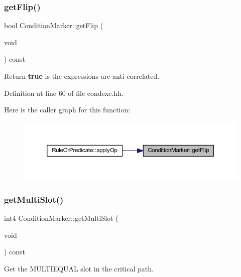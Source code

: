 \subsubsection{\texorpdfstring{getFlip()}{getFlip()}}
{\footnotesize\ttfamily bool Condition\+Marker\+::get\+Flip (\begin{DoxyParamCaption}\item[{void}]{ }\end{DoxyParamCaption}) const\hspace{0.3cm}{\ttfamily [inline]}}



Return {\bfseries{true}} is the expressions are anti-\/correlated. 



Definition at line 60 of file condexe.\+hh.

Here is the caller graph for this function\+:
\nopagebreak
\begin{figure}[H]
\begin{center}
\leavevmode
\includegraphics[width=350pt]{class_condition_marker_ac1a25557679f0be858c5bee6bd691b23_icgraph}
\end{center}
\end{figure}
\mbox{\label{class_condition_marker_a60a5e69db5a456966011d29dadb62a6b}} 
\subsubsection{\texorpdfstring{getMultiSlot()}{getMultiSlot()}}
{\footnotesize\ttfamily int4 Condition\+Marker\+::get\+Multi\+Slot (\begin{DoxyParamCaption}\item[{void}]{ }\end{DoxyParamCaption}) const\hspace{0.3cm}{\ttfamily [inline]}}



Get the M\+U\+L\+T\+I\+E\+Q\+U\+AL slot in the critical path. 



